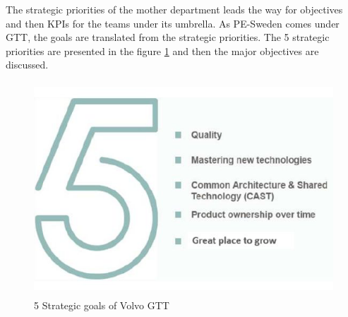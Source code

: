 The strategic priorities of the mother department leads the way for objectives and then KPIs for the teams under its umbrella. As PE-Sweden comes under GTT, the goals are translated from the strategic priorities. The 5 strategic priorities are presented in the figure \ref{fig:5.2} and then the major objectives are discussed.\\
    \begin{figure}[H]
    \centering
    \captionsetup{justification=centering, margin=2cm}
    \vspace{1cm}
    \includegraphics[width=13cm, height=8cm]{figure/auxiliary/fig52.PNG}
    \caption{5 Strategic goals of Volvo GTT}
    \label{fig:5.2}
\end{figure}
